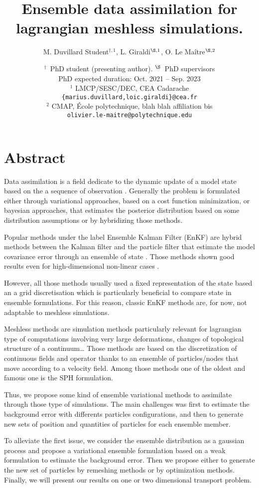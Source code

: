\documentclass[a4paper,10pt,oneside]{article}
\title{%
  Ensemble data assimilation for lagrangian meshless simulations.}
\author{%
  M. Duvillard Student${}^{\dagger,1}$, %
  L. Giraldi${}^{\S,1}$, %
  O. Le Maître${}^{\S,2}$}%
\date{\medskip%
  \small %
  ${}^\dagger$\ PhD student (presenting author). \quad ${}^{\S}$\ PhD supervisors\\[5pt]
  PhD expected duration: {Oct. 2021 -- Sep. 2023}\\[15pt]
  ${}^1$  LMCP/SESC/DEC, CEA Cadarache\\
  \texttt{\{marius.duvillard,loic.giraldi\}@cea.fr}\\[4pt]
  ${}^2$  CMAP, École polytechnique, blah blah affiliation bis\\
  \texttt{olivier.le-maitre@polytechnique.edu}}
\begin{document}
\maketitle

\thispagestyle{fancy}

\section*{Abstract}

Data assimilation is a field dedicate to the dynamic update of a model state based on the a sequence of observation \cite{asch_data_2016,evensen_data_2022}. Generally the problem is formulated either through variational approaches, based on a cost function minimization, or bayesian approaches, that estimates the posterior distribution based on some distribution assumptions or by hybridizing those methods.

Popular methods under the label Ensemble Kalman Filter (EnKF) are hybrid methods between the Kalman filter and the particle filter that estimate the model covariance error through an ensemble of state \cite{evensen_sequential_1994}. Those methods shown good results even for high-dimensional non-linear cases .

However, all those methods usually used a fixed representation of the state based an a grid discretisation which is particularly beneficial to compare state in ensemble formulations.
For this reason, classic EnKF methods are, for now, not adaptable to meshless simulations.

Meshless methods are simulation methods particularly relevant for lagrangian type of computations involving very large deformations, changes of topological structure of a continuum\dots
Those methods are based on the discretization of continuous fields and operator thanks to an ensemble of particles/nodes that move according to a velocity field. Among those methods one of the oldest and famous one is the SPH formulation.

Thus, we propose some kind of ensemble variational methods to assimilate through those type of simulations.
The main challenges was first to estimate the background error with differents particles configurations, and then to generate new sets of position and quantities of particles for each ensemble member.

To alleviate the first issue, we consider the ensemble distribution as a gaussian process and propose a variational ensemble formulation based on a weak formulation to estimate the background error.
Then we propose either to generate the new set of particles by remeshing methods or by optimization methods.
Finally, we will present our results on one or two dimensional transport problem.
\end{document}
